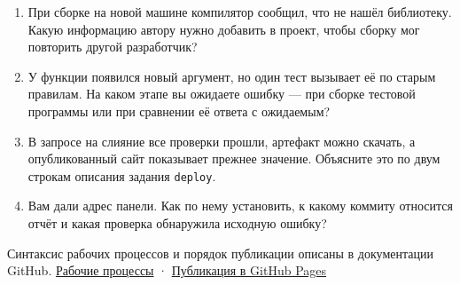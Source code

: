 \begin{enumerate}
\item При сборке на новой машине компилятор сообщил, что не нашёл библиотеку. Какую информацию автору нужно добавить в проект, чтобы сборку мог повторить другой разработчик?
\item У функции появился новый аргумент, но один тест вызывает её по старым правилам. На каком этапе вы ожидаете ошибку — при сборке тестовой программы или при сравнении её ответа с ожидаемым?
\item В запросе на слияние все проверки прошли, артефакт можно скачать, а опубликованный сайт показывает прежнее значение. Объясните это по двум строкам описания задания \texttt{deploy}.
\item Вам дали адрес панели. Как по нему установить, к какому коммиту относится отчёт и какая проверка обнаружила исходную ошибку?
\end{enumerate}

Синтаксис рабочих процессов и порядок публикации описаны в документации GitHub. \href{https://docs.github.com/en/actions/concepts/workflows-and-actions/workflows}{Рабочие процессы} · \href{https://docs.github.com/en/pages/getting-started-with-github-pages/using-custom-workflows-with-github-pages}{Публикация в GitHub Pages}

